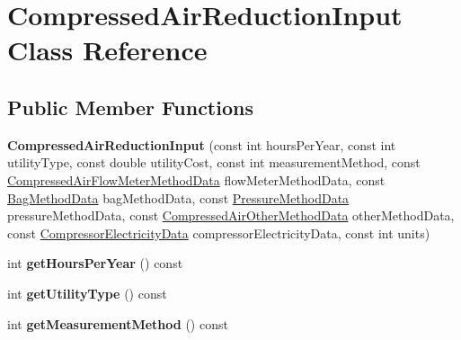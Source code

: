 \hypertarget{class_compressed_air_reduction_input}{}\section{Compressed\+Air\+Reduction\+Input Class Reference}
\label{class_compressed_air_reduction_input}
\subsection*{Public Member Functions}
\begin{DoxyCompactItemize}
\item 
\mbox{\label{class_compressed_air_reduction_input_ab77e29031a9683a8842612ac55868bf0}} 
{\bfseries Compressed\+Air\+Reduction\+Input} (const int hours\+Per\+Year, const int utility\+Type, const double utility\+Cost, const int measurement\+Method, const \hyperlink{class_compressed_air_flow_meter_method_data}{Compressed\+Air\+Flow\+Meter\+Method\+Data} flow\+Meter\+Method\+Data, const \hyperlink{class_bag_method_data}{Bag\+Method\+Data} bag\+Method\+Data, const \hyperlink{class_pressure_method_data}{Pressure\+Method\+Data} pressure\+Method\+Data, const \hyperlink{class_compressed_air_other_method_data}{Compressed\+Air\+Other\+Method\+Data} other\+Method\+Data, const \hyperlink{class_compressor_electricity_data}{Compressor\+Electricity\+Data} compressor\+Electricity\+Data, const int units)
\item 
\mbox{\label{class_compressed_air_reduction_input_a7081f6958226f9e63330c5238a8d8e2b}} 
int {\bfseries get\+Hours\+Per\+Year} () const
\item 
\mbox{\label{class_compressed_air_reduction_input_a94e2975b61c875643a3b3b6d5eb3112b}} 
int {\bfseries get\+Utility\+Type} () const
\item 
\mbox{\label{class_compressed_air_reduction_input_a88e82bcb0399fb29044e77f11384f439}} 
int {\bfseries get\+Measurement\+Method} () const
\item 
\mbox{\label{class_compressed_air_reduction_input_ab4368f51ab9bc08a80dae0e9727da3fb}} 

\end{DoxyCompactItemize}
